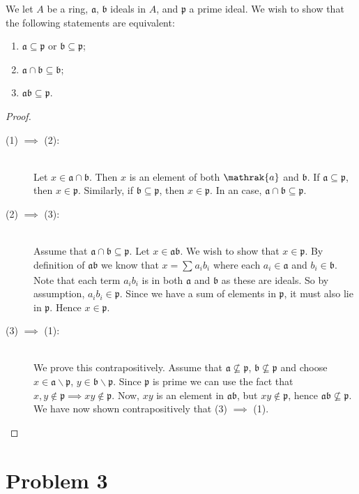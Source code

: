 \documentclass{article}
\newcommand{\p}{\mathfrak{p}}
\renewcommand{\a}{\mathfrak{a}}
\renewcommand{\b}{\mathfrak{b}}
\begin{document}
    We let $A$ be a ring, $\mathfrak{a}$, $\mathfrak{b}$ ideals in $A$, and
    $\mathfrak{p}$ a prime ideal. We wish to show that the following statements
    are equivalent:
    \begin{enumerate}[(1)]
        \item $\a \subseteq \p$ or $\b \subseteq \p$;
        \item $\a \cap \b \subseteq \b$;
        \item $\a\b \subseteq \p$.
    \end{enumerate}
    \begin{proof} 
        \hfill
        \begin{description}
            \item[(1) $\implies$ (2):]\hfill  \\
                Let $x \in \a\cap\b$.
                Then $x$ is an element of both $\mathrak{a}$ and
                $\b$. If $\a \subseteq \p$, then
                $x \in \p$. Similarly, if $\b \subseteq
                \p$, then $x \in \p$. In an case,
                $\a\cap\b \subseteq \p$.
            \item[(2) $\implies$ (3):]\hfill \\
                Assume that $\a \cap \b \subseteq \p$. Let $x \in \a\b$. We
                wish to show that $x \in \p$. By definition of $\a\b$ we know
                that $x = \sum^{}_{} a_ib_i$ where each $a_i \in \a$ and $b_i
                \in \b$. Note that each term $a_ib_i$ is in both $\a$ and $\b$
                as these are ideals. So by assumption, $a_ib_i \in \p$. Since
                we have a sum of elements in $\p$, it must also lie in $\p$.
                Hence $x \in \p$.
            \item[(3) $\implies$ (1):]\hfill \\
                We prove this contrapositively. Assume that $\a \not\subseteq
                \p$, $\b \not\subseteq \p$ and choose $x \in \a \smallsetminus
                \p$, $y \in \b \smallsetminus \p$. Since $\p$ is prime we can
                use the fact that $x, y \notin \p \implies xy \notin \p$. Now,
                $xy$ is an element in $\a\b$, but $xy \notin \p$, hence $\a\b
                \not\subseteq \p$. We have now shown contrapositively that (3)
                $\implies$ (1).
        \end{description}
    \end{proof}
    
    \section*{Problem 3}
    \label{sec:problem_3}
     
\end{document}
